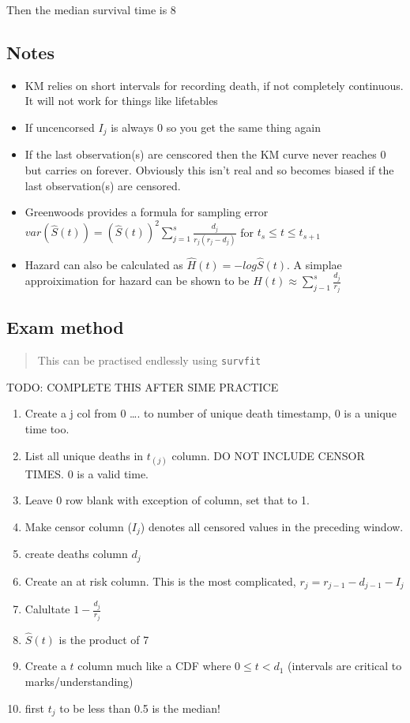 \documentclass[
  letterpaper,
  DIV=11,
  numbers=noendperiod]{scrreprt}
\providecommand{\tightlist}{%
  \setlength{\itemsep}{0pt}\setlength{\parskip}{0pt}}\usepackage{longtable,booktabs,array}
\begin{document}
Then the median survival time is 8

\hypertarget{notes}{%
\subsection{Notes}\label{notes}}

\begin{itemize}
\tightlist
\item
  KM relies on short intervals for recording death, if not completely
  continuous. It will not work for things like lifetables
\item
  If uncencorsed \(I_j\) is always 0 so you get the same thing again
\item
  If the last observation(s) are censcored then the KM curve never
  reaches 0 but carries on forever. Obviously this isn't real and so
  becomes biased if the last observation(s) are censored.
\item
  Greenwoods provides a formula for sampling error
  \(var(\hat{S}(t)) = (\hat{S}(t))^2 \sum^s_{j=1} \frac{d_j}{r_j(r_j - d_j)}\)
  for \(t_s\leq t \leq t_{s+1}\)
\item
  Hazard can also be calculated as \(\hat{H}(t) = -log\hat{S}(t)\). A
  simplae approiximation for hazard can be shown to be
  \(H(t) \approx \sum_{j-1}^s\frac{d_j}{r_j}\)
\end{itemize}

\hypertarget{exam-method}{%
\subsection{Exam method}\label{exam-method}}

\begin{quote}
This can be practised endlessly using \texttt{survfit}
\end{quote}

TODO: COMPLETE THIS AFTER SIME PRACTICE

\begin{enumerate}
\def\labelenumi{\arabic{enumi})}
\tightlist
\item
  Create a j col from 0 \ldots. to number of unique death timestamp, 0
  is a unique time too.
\item
  List all unique deaths in \(t_{(j)}\) column. DO NOT INCLUDE CENSOR
  TIMES. 0 is a valid time.
\item
  Leave 0 row blank with exception of  column, set that to 1.
\item
  Make censor column (\(I_j\)) denotes all censored values in the
  preceding window.
\item
  create deaths column \(d_j\)
\item
  Create an at risk column. This is the most complicated,
  \(r_j = r_{j-1} - d_{j-1} - I_j\)
\item
  Calultate \(1 - \frac{d_j}{r_j}\)
\item
  \(\hat{S}(t)\) is the product of 7
\item
  Create a \(t\) column much like a CDF where \(0 \leq t < d_1\)
  (intervals are critical to marks/understanding)
\item
  first \(t_j\) to be less than 0.5 is the median!
\end{enumerate}
\end{document}
